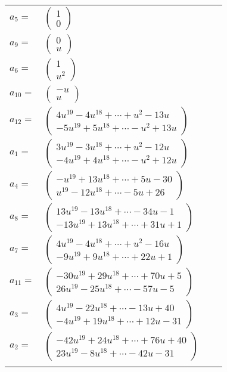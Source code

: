 \documentclass[1p]{elsarticle_modified}
\theoremstyle{definition}
\begin{document}
\begin{tabular}{m{7pt} m{180pt} m{7pt} m{180pt} }
\flushright $a_{5}=$&$\begin{pmatrix}1\\0\end{pmatrix}$ \\
\flushright $a_{9}=$&$\begin{pmatrix}0\\u\end{pmatrix}$ \\
\flushright $a_{6}=$&$\begin{pmatrix}1\\u^2\end{pmatrix}$ \\
\flushright $a_{10}=$&$\begin{pmatrix}- u\\u\end{pmatrix}$ \\
\flushright $a_{12}=$&$\begin{pmatrix}4 u^{19}-4 u^{18}+\cdots+u^2-13 u\\-5 u^{19}+5 u^{18}+\cdots- u^2+13 u\end{pmatrix}$ \\
\flushright $a_{1}=$&$\begin{pmatrix}3 u^{19}-3 u^{18}+\cdots+u^2-12 u\\-4 u^{19}+4 u^{18}+\cdots- u^2+12 u\end{pmatrix}$ \\
\flushright $a_{4}=$&$\begin{pmatrix}- u^{19}+13 u^{18}+\cdots+5 u-30\\u^{19}-12 u^{18}+\cdots-5 u+26\end{pmatrix}$ \\
\flushright $a_{8}=$&$\begin{pmatrix}13 u^{19}-13 u^{18}+\cdots-34 u-1\\-13 u^{19}+13 u^{18}+\cdots+31 u+1\end{pmatrix}$ \\
\flushright $a_{7}=$&$\begin{pmatrix}4 u^{19}-4 u^{18}+\cdots+u^2-16 u\\-9 u^{19}+9 u^{18}+\cdots+22 u+1\end{pmatrix}$ \\
\flushright $a_{11}=$&$\begin{pmatrix}-30 u^{19}+29 u^{18}+\cdots+70 u+5\\26 u^{19}-25 u^{18}+\cdots-57 u-5\end{pmatrix}$ \\
\flushright $a_{3}=$&$\begin{pmatrix}4 u^{19}-22 u^{18}+\cdots-13 u+40\\-4 u^{19}+19 u^{18}+\cdots+12 u-31\end{pmatrix}$ \\
\flushright $a_{2}=$&$\begin{pmatrix}-42 u^{19}+24 u^{18}+\cdots+76 u+40\\23 u^{19}-8 u^{18}+\cdots-42 u-31\end{pmatrix}$\\&\end{tabular}
\end{document}
